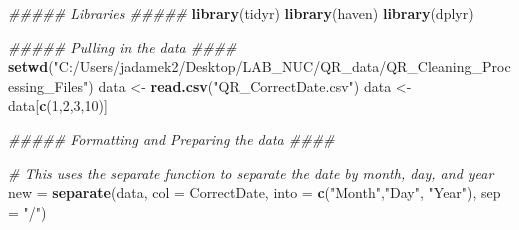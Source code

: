 \documentclass[
]{book}
\newenvironment{Shaded}{\begin{snugshade}}{\end{snugshade}}
\newcommand{\CommentTok}[1]{\textcolor[rgb]{0.56,0.35,0.01}{\textit{#1}}}
\newcommand{\DataTypeTok}[1]{\textcolor[rgb]{0.13,0.29,0.53}{#1}}
\newcommand{\DecValTok}[1]{\textcolor[rgb]{0.00,0.00,0.81}{#1}}
\newcommand{\KeywordTok}[1]{\textcolor[rgb]{0.13,0.29,0.53}{\textbf{#1}}}
\newcommand{\NormalTok}[1]{#1}
\newcommand{\StringTok}[1]{\textcolor[rgb]{0.31,0.60,0.02}{#1}}
\begin{document}
\begin{Shaded}
\begin{Highlighting}[]
\CommentTok{##### Libraries #####}
\KeywordTok{library}\NormalTok{(tidyr)}
\KeywordTok{library}\NormalTok{(haven)}
\KeywordTok{library}\NormalTok{(dplyr)}

\CommentTok{##### Pulling in the data ####}
\KeywordTok{setwd}\NormalTok{(}\StringTok{"C:/Users/jadamek2/Desktop/LAB_NUC/QR_data/QR_Cleaning_Processing_Files"}\NormalTok{)}
\NormalTok{data <-}\StringTok{ }\KeywordTok{read.csv}\NormalTok{(}\StringTok{"QR_CorrectDate.csv"}\NormalTok{)}
\NormalTok{data <-}\StringTok{ }\NormalTok{data[}\KeywordTok{c}\NormalTok{(}\DecValTok{1}\NormalTok{,}\DecValTok{2}\NormalTok{,}\DecValTok{3}\NormalTok{,}\DecValTok{10}\NormalTok{)]}

\CommentTok{##### Formatting and Preparing the data ####}

\CommentTok{# This uses the separate function to separate the date by month, day, and year}
\NormalTok{new =}\StringTok{ }\KeywordTok{separate}\NormalTok{(data, }\DataTypeTok{col =}\NormalTok{ CorrectDate, }\DataTypeTok{into =} \KeywordTok{c}\NormalTok{(}\StringTok{"Month"}\NormalTok{,}\StringTok{"Day"}\NormalTok{, }\StringTok{"Year"}\NormalTok{), }\DataTypeTok{sep =} \StringTok{"/"}\NormalTok{)}


\end{Highlighting}
\end{Shaded}
\end{document}
